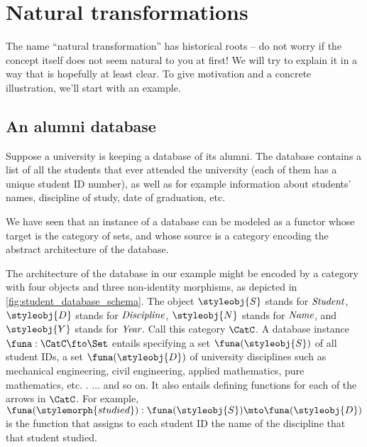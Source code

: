 
\section{Natural transformations}


The name ``natural transformation'' has historical roots -- do not worry if the concept itself does not seem natural to you at first!
We will try to explain it in a way that is hopefully at least clear.
To give motivation and a concrete illustration, we'll start with an example.

\subsection{An alumni database}

Suppose a university is keeping a database of its alumni.
The database contains a list of all the students that ever attended the university (each of them has a unique student ID number), as well as for example information about students' names, discipline of study, date of graduation, etc.

We have seen that an instance of a database can be modeled as a functor whose target is the category of sets, and whose source is a category encoding the abstract architecture of the database.

%
\begin{marginfigure}
    \centering
    \caption{}
    \label{fig:student_database_schema}
\end{marginfigure}
%

The architecture of the database in our example might be encoded by a category with four objects and three non-identity morphisms, as depicted in \cref{fig:student_database_schema}.
The object $\styleobj{S}$ stands for $\emph{Student}$, $\styleobj{D}$ stands for $\emph{Discipline}$, $\styleobj{N}$ stands for $\emph{Name}$, and $\styleobj{Y}$ stands for $\emph{Year}$.
Call this category $\CatC$.
A database instance $\funa : \CatC \fto \Set$ entails specifying a set $\funa(\styleobj{S})$ of all student IDs, a set $\funa(\styleobj{D})$ of university disciplines such as mechanical engineering, civil engineering, applied mathematics, pure mathematics, etc. .
... and so on.
It also entails defining functions for each of the arrows in $\CatC$.
For example, $\funa(\stylemorph{studied}) : \funa(\styleobj{S}) \mto \funa(\styleobj{D})$ is the function that assigns to each student ID the name of the discipline that that student studied.

